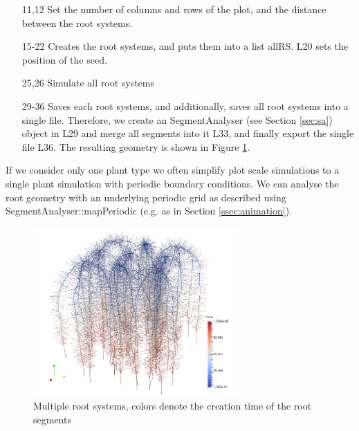 \begin{itemize}

\item[11,12] Set the number of columns and rows of the plot, and the distance between the root systems.

\item[15-22] Creates the root systems, and puts them into a list allRS. L20 sets the position of the seed. 

\item[25,26] Simulate all root systems 

\item[29-36] Saves each root systems, and additionally, saves all root systems into a single file. 
Therefore, we create an SegmentAnalyser (see Section \ref{sec:sa}) object in L29 and merge all segments into it L33, 
and finally export the single file L36. The resulting geometry is shown in Figure \ref{fig:multiple}.

\end{itemize}

If we consider only one plant type we often simplify plot scale simulations to a single plant simulation with periodic boundary conditions. We can analyse the root geometry with an underlying periodic grid as described using SegmentAnalyser::mapPeriodic (e.g. as in Section \ref{ssec:animation}). 

\begin{figure}
\centering
\includegraphics[width=0.7\textwidth]{example_2b.png}
\caption{Multiple root systems, colors denote the creation time of the root segments} \label{fig:multiple}
\end{figure}
